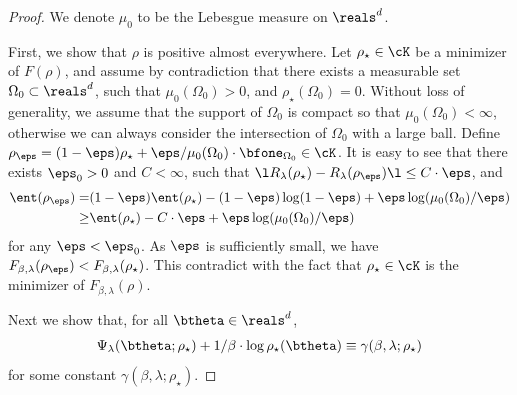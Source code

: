\documentclass[11pt]{article}
\begin{document}
\begin{proof}
We denote $\mu_0$ to be the Lebesgue measure on $\reals^d$. 

First, we show that $\rho$ is positive almost everywhere. Let $\rho_\star \in \cK$ be a minimizer of $F(\rho)$, and assume by contradiction that there exists a measurable set 
$\Omega_0 \subset \reals^d$, such that $\mu_0(\Omega_0) > 0$, and $\rho_\star(\Omega_0) = 0$. Without loss of generality, we assume that the support of $\Omega_0$ is compact so that $\mu_0(\Omega_0) < \infty$, otherwise we can always consider the intersection of $\Omega_0$ with a large ball. Define $\rho_\eps = (1 - \eps) \rho_\star + \eps  / \mu_0(\Omega_0) \cdot \bfone_{\Omega_0}\in \cK$. It is easy to see that there exists $ \eps_0 > 0$ and $C < \infty$, such that $\l R_\lambda(\rho_\star) - R_\lambda(\rho_\eps) \l \le C \cdot \eps$, and 
\[
\begin{aligned}
\ent(\rho_\eps) =& (1- \eps) \ent(\rho_\star) - (1 - \eps) \log (1 - \eps) + \eps \log (\mu_0(\Omega_0)/\eps) \\
\ge& \ent(\rho_\star)  - C \cdot \eps + \eps \log (\mu_0(\Omega_0)/\eps)
\end{aligned}
\]
for any $\eps < \eps_0$. As $\eps$ is sufficiently small, we have $F_{\beta, \lambda}(\rho_\eps) < F_{\beta, \lambda}(\rho_\star)$. This contradict with the fact that $\rho_\star \in \cK$ is the minimizer of $F_{\beta, \lambda}(\rho)$. 

Next we show that, for all $\btheta\in\reals^d$,
\begin{align}\label{eqn:log_BoltzmannEquation}
\Psi_\lambda(\btheta; \rho_\star) + 1/\beta \cdot \log \rho_\star(\btheta) \equiv \gamma(\beta, \lambda; \rho_\star)
\end{align}
for some constant $\gamma(\beta, \lambda; \rho_\star)$. 


\end{proof}
\end{document}
